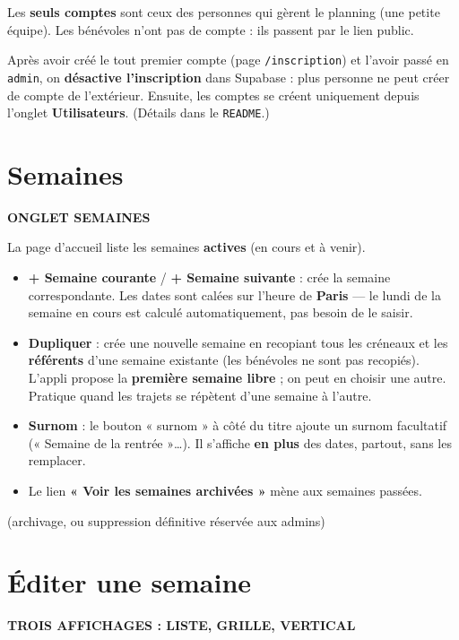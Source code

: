 \documentclass[11pt,a4paper]{article}
\newcommand{\eyebrow}[1]{{\sffamily\fontfamily{qag}\selectfont\bfseries\small\color{accentdark}\MakeUppercase{#1}}\par\vspace{2pt}}
\begin{document}
\begin{notebox}
Les \textbf{seuls comptes} sont ceux des personnes qui gèrent le planning (une petite équipe).
Les bénévoles n'ont pas de compte : ils passent par le lien public.

\vspace{4pt}
Après avoir créé le tout premier compte (page \texttt{/inscription}) et l'avoir passé en
\texttt{admin}, on \textbf{désactive l'inscription} dans Supabase : plus personne ne peut créer
de compte de l'extérieur. Ensuite, les comptes se créent uniquement depuis l'onglet
\textbf{Utilisateurs}. (Détails dans le \texttt{README}.)
\end{notebox}

\newpage
\section{Semaines}
\eyebrow{Onglet Semaines}

La page d'accueil liste les semaines \textbf{actives} (en cours et à venir).

\begin{itemize}
  \item \textbf{+ Semaine courante} / \textbf{+ Semaine suivante} : crée la semaine
  correspondante. Les dates sont calées sur l'heure de \textbf{Paris} — le lundi de la semaine
  en cours est calculé automatiquement, pas besoin de le saisir.
  \item \textbf{Dupliquer} : crée une nouvelle semaine en recopiant tous les créneaux et les
  \textbf{référents} d'une semaine existante (les bénévoles ne sont pas recopiés). L'appli
  propose la \textbf{première semaine libre} ; on peut en choisir une autre. Pratique quand
  les trajets se répètent d'une semaine à l'autre.
  \item \textbf{Surnom} : le bouton « surnom » à côté du titre ajoute un surnom facultatif
  (« Semaine de la rentrée »…). Il s'affiche \textbf{en plus} des dates, partout, sans les
  remplacer.
  \item Le lien \textbf{« Voir les semaines archivées »} mène aux semaines passées.
\end{itemize}

 \; (archivage, ou suppression définitive réservée
aux admins)

\section{Éditer une semaine}
\eyebrow{Trois affichages : Liste, Grille, Vertical}
\end{document}
